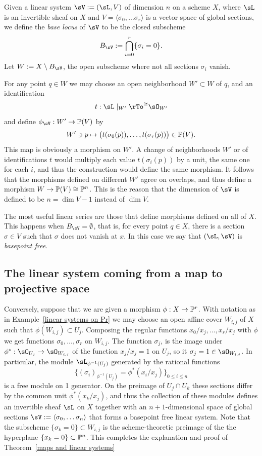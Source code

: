 Given a linear system $\sV:=(\sL, V)$  of dimension $n$ on a scheme $X$, where
$\sL$ is an invertible sheaf on $X$ and $V = \langle\sigma_{0}, \dots \sigma_{r}\rangle$ is a vector space of global sections, we define the \emph{base locus} of $\sV$ to be the closed subscheme 
$$
B_\sV := \bigcap_{i= 0}^{r}\{\sigma_{i} = 0\}.
$$
Let $W:=X\setminus B_\sV$, the open subscheme where not all sections $\sigma_{i}$ vanish.

For any point $q\in W$ we  may choose an open neighborhood $W'\subset W$ of $q$, and an identification 
$$
t: \sL\mid_{W'} \rTo^{\cong} \sO_{W'}
$$
and define $\phi_{\sV}: W' \to \PP(V)$ by 
$$
W'\ni p \mapsto \bigl(t(\sigma_{0}(p)),\dots, t(\sigma_{r}(p))\bigr) \in \PP(V).
$$
This map is obviously a morphism on $W'$. A change of neighborhoods $W'$ or of identifications $t$ would multiply
each value $t(\sigma_{i}(p))$ by a unit, the same one for each $i$, and thus the construction would define the same morphism. It follows that the morphisms
defined on different $W'$ agree on overlaps, and thus define a morphism $W \to \PP(V) \cong \PP^n$. This is the reason
that the dimension of $\sV$ is defined to be $n=\dim V -1$ instead of $\dim V$.

The most useful linear series are those that define morphisms defined on all of $X$. This happens when $B_\sV = \emptyset$,
that is, for every point $q\in X$, there is a section $\sigma \in V$ such that $\sigma$ does not vanish at $x$. In this case we say that $(\sL, \sV)$ is \emph{basepoint free}.

\subsection{The linear system coming from a map to projective space}

Conversely, suppose that we are given a morphism $\phi: X\to \PP^{r}$. With notation as in Example~\ref{linear systems on Pr} we may choose an open affine cover $W_{i,j}$ of $X$ such that $\phi(W_{i,j})\subset U_{j}$. Composing the regular
functions
$x_{0}/x_{j},\dots, x_{r}/x_{j}$ with $\phi$ we get functions $\sigma_{0},\dots,\sigma_{r}$ on $W_{i,j}$.  The function $\sigma_{j}$, is the image under $\phi^*: \sO_{U_j} \to \sO_{W_{i,j}}$ of the function $x_j/x_j = 1$ on $U_{j}$, so it $\sigma_j = 1\in \sO_{W_{i,j}}$. In particular, the module $\sL_{\phi^{-1}(U_j)}$ generated by the rational functions 
$$
\{(\sigma_i)_{\phi^{-1}(U_j)} = \phi^*(x_i/x_j)\}_{0\leq i\leq n}
$$
 is a free module on 1 generator. On the preimage of $U_j\cap U_k$ these sections differ by the common unit $\phi^*(x_k/x_j)$, and thus the collection of these modules defines an invertible sheaf $\sL$ on $X$ together with an
$n+1$-dimensional space of global sections $\sV := \langle \sigma_0,\dots \sigma_n\rangle$ that forms a basepoint free linear system. Note that the subscheme  $\{\sigma_k = 0\} \subset W_{i,j}$  is the scheme-theoretic preimage of the
the hyperplane $\{x_k = 0\}\subset \PP^n$. This completes the explanation and proof of Theorem~\ref{maps and linear systems}

